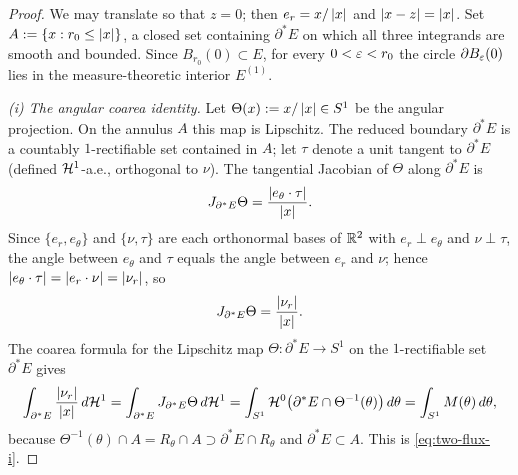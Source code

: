 \begin{proof}
We may translate so that $z=0$; then $e_r=x/\left\lvert x\right\rvert$ and $\left\lvert x-z\right\rvert=\left\lvert x\right\rvert$.
Set $A:=\{x:r_0\le\left\lvert x\right\rvert\}$, a closed set containing $\partial^*E$ on which
all three integrands are smooth and bounded. Since $B_{r_0}(0)\subset E$,
for every $0<\varepsilon<r_0$ the circle $\partial B_\varepsilon(0)$ lies in the
measure-theoretic interior $E^{(1)}$.

\emph{(i) The angular coarea identity.}
Let $\Theta(x):=x/\left\lvert x\right\rvert\in S^1$ be the angular projection.  On the annulus
$A$ this map is Lipschitz.  The reduced boundary $\partial^*E$ is a
countably $1$-rectifiable set contained in $A$; let $\tau$ denote a unit
tangent to $\partial^*E$ (defined $\mathcal{H}^1$-a.e., orthogonal to $\nu$). The
tangential Jacobian of $\Theta$ along $\partial^*E$ is
\[
   J_{\partial^*E}\Theta
   =\frac{\left\lvert e_\theta\cdot\tau\right\rvert}{\left\lvert x\right\rvert}.
\]
Since $\{e_r,e_\theta\}$ and $\{\nu,\tau\}$ are each orthonormal bases of
$\mathbb{R}^2$ with $e_r\perp e_\theta$ and $\nu\perp\tau$, the angle between
$e_\theta$ and $\tau$ equals the angle between $e_r$ and $\nu$; hence
$\left\lvert e_\theta\cdot\tau\right\rvert=\left\lvert e_r\cdot\nu\right\rvert=\left\lvert\nu_r\right\rvert$, so
\[
   J_{\partial^*E}\Theta=\frac{\left\lvert\nu_r\right\rvert}{\left\lvert x\right\rvert}.
\]
The coarea formula for the Lipschitz map
$\Theta\colon\partial^*E\to S^1$ on the $1$-rectifiable set
$\partial^*E$ \cite[Theorem~2.93]{AFP2000} gives
\[
   \int_{\partial^*E}\frac{\left\lvert\nu_r\right\rvert}{\left\lvert x\right\rvert}\,d\mathcal{H}^1
   =\int_{\partial^*E}J_{\partial^*E}\Theta\,d\mathcal{H}^1
   =\int_{S^1}\mathcal{H}^0\bigl(\partial^*E\cap \Theta^{-1}(\theta)\bigr)\,d\theta
   =\int_{S^1}M(\theta)\,d\theta,
\]
because $\Theta^{-1}(\theta)\cap A=R_\theta\cap A\supset
\partial^*E\cap R_\theta$ and $\partial^*E\subset A$. This is
\eqref{eq:two-flux-i}.


\end{proof}
